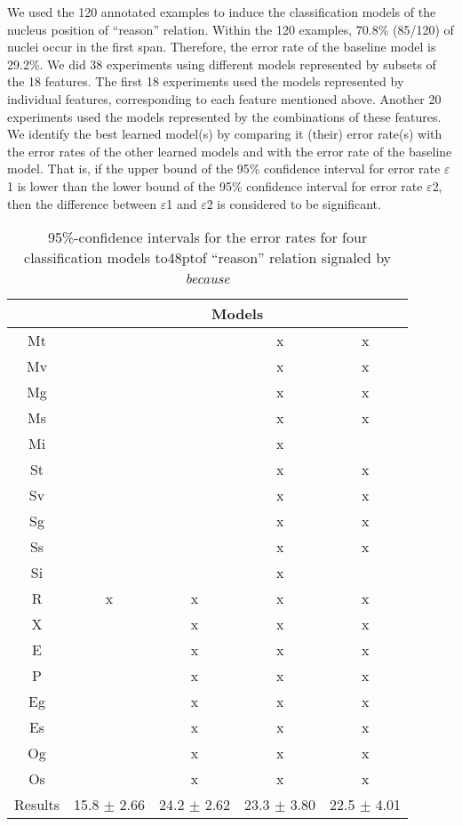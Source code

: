 \documentclass[english]{jnlp_1.2.0}
\begin{document}
We used the 120 annotated examples to induce the classification models 
of the nucleus position of ``reason'' relation. Within the 120
examples, 70.8\% (85/120) of nuclei occur in the first span. Therefore, 
the error rate of the baseline model is 29.2\%. We did 38 experiments 
using different models represented by subsets of the 18 features. 
The first 18 experiments used the models represented 
by individual features, corresponding to each feature mentioned above. 
Another 20 experiments used the models represented by the combinations 
of these features. We identify the best learned model(s) by comparing 
it (their) error rate(s) with the error rates of the other learned 
models and with the error rate of the baseline model. That is, if 
the upper bound of the 95\% confidence interval for error 
rate $\varepsilon$1 is lower than the lower bound of the 95\% 
confidence interval for error rate $\varepsilon$2, then the 
difference between $\varepsilon$1 and $\varepsilon$2 is considered 
to be significant. 

\begin{table}[b]
\caption{\setlength{\leftskip}{40pt}\setlength{\rightskip}{40pt}
95\%-confidence intervals for the error rates for four classification models \hbox to48pt{}of ``reason'' relation signaled by \textit{because}}
\begin{center}
 \begin{tabular}{|c|c|c|c|c|} \hline
    & \multicolumn{4}{|c|}{Models} \\ \hline \hline
Mt  &   &   & x & x   \\ 
Mv  &   &   & x & x   \\   
Mg  &   &   & x & x   \\   
Ms  &   &   & x & x   \\ 
Mi  &   &   & x &     \\
St  &   &   & x & x   \\
Sv  &   &   & x & x   \\
Sg  &   &   & x & x   \\
Ss  &   &   & x & x   \\
Si  &   &   & x &     \\
R   & x & x & x & x   \\
X   &   & x & x & x   \\
E   &   & x & x & x   \\
P   &   & x & x & x   \\
Eg  &   & x & x & x   \\
Es  &   & x & x & x   \\
Og  &   & x & x & x   \\
Os  &   & x & x & x   \\ \hline \hline
Results & 15.8 $\pm$ 2.66 & 24.2 $\pm$ 2.62 & 23.3 $\pm$ 3.80 & 22.5 $\pm$ 4.01  \\ \hline
\end{tabular}
\end{center}
\end{table}
\end{document}
